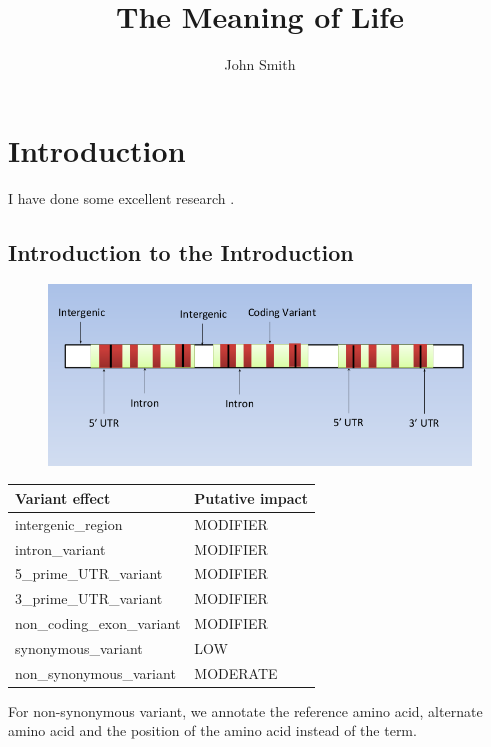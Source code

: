 \documentclass[onehalf,11pt]{beavtex}
\title{The Meaning of Life}
\author{John Smith}
\begin{document}
\maketitle

\mainmatter

\chapter{Introduction}
I have done some excellent research \cite{matrix}.
\section{Introduction to the Introduction}
\begin{figure}[!ht]
\centering
\includegraphics[scale=0.6]{./pic/type.png}
\caption{}
\end{figure}

\begin{table}[H]
\centering
\begin{tabular}{l| l}
\hline
Variant effect & Putative impact \\
\hline
  intergenic\_region & MODIFIER \\
  intron\_variant & MODIFIER \\
  5\_prime\_UTR\_variant & MODIFIER \\
  3\_prime\_UTR\_variant & MODIFIER \\
  non\_coding\_exon\_variant & MODIFIER \\
  synonymous\_variant & LOW \\
  non\_synonymous\_variant & MODERATE \\

\end{tabular}
\end{table}

For non-synonymous variant, we annotate the reference amino acid, alternate amino acid and the position of the amino acid instead of the term.
\end{document}
